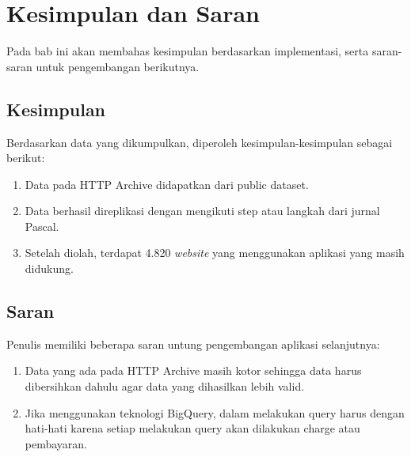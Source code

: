 \chapter{Kesimpulan dan Saran}
\label{chap:kesimpulan_dan_saran}

Pada bab ini akan membahas kesimpulan berdasarkan implementasi, serta saran-saran untuk pengembangan berikutnya.

\section{Kesimpulan}
Berdasarkan data yang dikumpulkan, diperoleh kesimpulan-kesimpulan sebagai berikut:
\begin{enumerate}
	\item Data pada HTTP Archive didapatkan dari public dataset.
	\item Data berhasil direplikasi dengan mengikuti step atau langkah dari jurnal Pascal\cite{pascal}. 
	\item Setelah diolah, terdapat 4.820 \textit{website} yang menggunakan aplikasi yang masih didukung.
\end{enumerate}

\section{Saran}
Penulis memiliki beberapa saran untung pengembangan aplikasi selanjutnya:
\begin{enumerate}
	\item Data yang ada pada HTTP Archive masih kotor sehingga data harus dibersihkan dahulu agar data yang dihasilkan lebih valid.
	\item Jika menggunakan teknologi BigQuery, dalam melakukan query harus dengan hati-hati karena setiap melakukan query akan dilakukan charge atau pembayaran.
\end{enumerate}